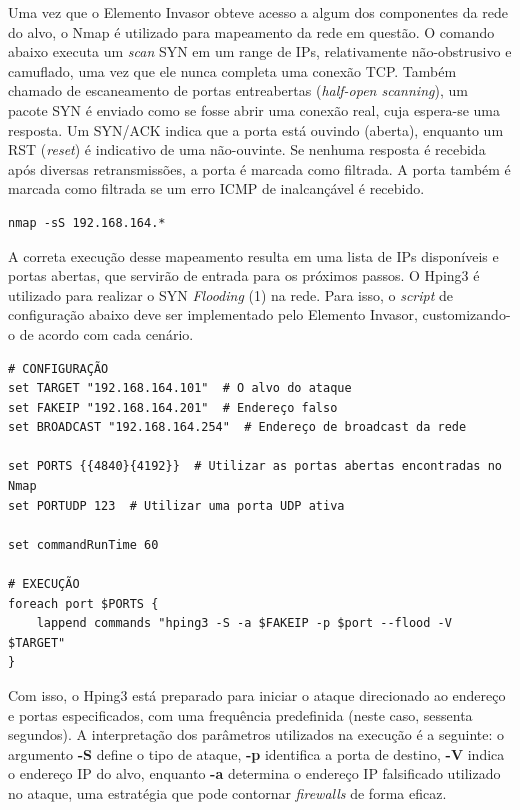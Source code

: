     Uma vez que o Elemento Invasor obteve acesso a algum dos componentes da rede do alvo, o Nmap é utilizado para mapeamento da rede em questão. O comando abaixo executa um \textit{scan} SYN em um range de IPs, relativamente não-obstrusivo e camuflado, uma vez que ele nunca completa uma conexão TCP. Também chamado de escaneamento de portas entreabertas (\textit{half-open scanning}), um pacote SYN é enviado como se fosse abrir uma conexão real, cuja espera-se uma resposta. Um SYN/ACK indica que a porta está ouvindo (aberta), enquanto um RST (\textit{reset}) é indicativo de uma não-ouvinte. Se nenhuma resposta é recebida após diversas retransmissões, a porta é marcada como filtrada. A porta também é marcada como filtrada se um erro ICMP de inalcançável é recebido.

    \begin{verbatim}
nmap -sS 192.168.164.*
    \end{verbatim}

    A correta execução desse mapeamento resulta em uma lista de IPs disponíveis e portas abertas, que servirão de entrada para os próximos passos. O Hping3 é utilizado para realizar o SYN \textit{Flooding} (1) na rede. Para isso, o \textit{script} de configuração abaixo deve ser implementado pelo Elemento Invasor, customizando-o de acordo com cada cenário.

    \begin{verbatim}
# CONFIGURAÇÃO
set TARGET "192.168.164.101"  # O alvo do ataque
set FAKEIP "192.168.164.201"  # Endereço falso
set BROADCAST "192.168.164.254"  # Endereço de broadcast da rede

set PORTS {{4840}{4192}}  # Utilizar as portas abertas encontradas no Nmap
set PORTUDP 123  # Utilizar uma porta UDP ativa

set commandRunTime 60

# EXECUÇÃO
foreach port $PORTS {
    lappend commands "hping3 -S -a $FAKEIP -p $port --flood -V $TARGET"
}
    \end{verbatim}

    Com isso, o Hping3 está preparado para iniciar o ataque direcionado ao endereço e portas especificados, com uma frequência predefinida (neste caso, sessenta segundos). A interpretação dos parâmetros utilizados na execução é a seguinte: o argumento \textbf{-S} define o tipo de ataque, \textbf{-p} identifica a porta de destino, \textbf{-V} indica o endereço IP do alvo, enquanto \textbf{-a} determina o endereço IP falsificado utilizado no ataque, uma estratégia que pode contornar \textit{firewalls} de forma eficaz.

